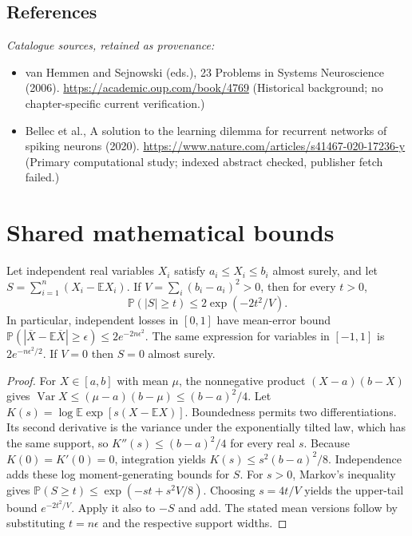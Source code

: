 \documentclass[11pt]{article}
\begin{document}
\subsection{References}
\noindent\emph{Catalogue sources, retained as provenance:}
\begin{itemize}
\item van Hemmen and Sejnowski (eds.), 23 Problems in Systems Neuroscience (2006). \url{https://academic.oup.com/book/4769} (Historical background; no chapter-specific current verification.)
\item Bellec et al., A solution to the learning dilemma for recurrent networks of spiking neurons (2020). \url{https://www.nature.com/articles/s41467-020-17236-y} (Primary computational study; indexed abstract checked, publisher fetch failed.)
\end{itemize}




\section{Shared mathematical bounds}\label{app:bounds}
\begin{lemma}\label{lem:bounded}
Let independent real variables $X_i$ satisfy $a_i\leq X_i\leq b_i$ almost surely,
and let $S=\sum_{i=1}^n(X_i-\mathbb{E} X_i)$. If
$V=\sum_i(b_i-a_i)^2>0$, then for every $t>0$,
\[
 \mathbb{P}(|S|\geq t)\leq 2\exp(-2t^2/V).
\]
In particular, independent losses in $[0,1]$ have mean-error bound
$\mathbb{P}(|\overline X-\mathbb{E}\overline X|\geq\epsilon)
\leq2e^{-2n\epsilon^2}$. The same expression for variables in $[-1,1]$
is $2e^{-n\epsilon^2/2}$. If $V=0$ then $S=0$ almost surely.
\end{lemma}
\begin{proof}
For $X\in[a,b]$ with mean $\mu$, the nonnegative product
$(X-a)(b-X)$ gives
$\operatorname{Var} X\leq(\mu-a)(b-\mu)\leq(b-a)^2/4$.
Let $K(s)=\log\mathbb{E}\exp[s(X-\mathbb{E} X)]$.
Boundedness permits two differentiations. Its second derivative is the variance
under the exponentially tilted law, which has the same support, so
$K''(s)\leq(b-a)^2/4$ for every real $s$.
Because $K(0)=K'(0)=0$, integration yields
$K(s)\leq s^2(b-a)^2/8$.
Independence adds these log moment-generating bounds for $S$.
For $s>0$, Markov's inequality gives
$\mathbb{P}(S\geq t)\leq\exp(-st+s^2V/8)$.
Choosing $s=4t/V$ yields the upper-tail bound $e^{-2t^2/V}$.
Apply it also to $-S$ and add. The stated mean versions follow by substituting
$t=n\epsilon$ and the respective support widths.
\end{proof}
\end{document}
